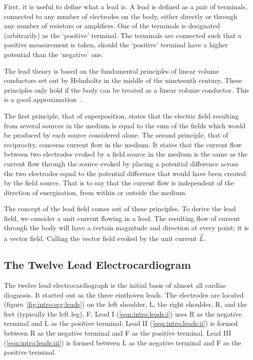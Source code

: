 First, it is useful to define what a lead is.
A lead is defined as a pair of terminals, connected to any number of electrodes
on the body, either directly or through any number of resistors or amplifiers.
One of the terminals is designated (arbitrarily) as the `positive' terminal.
The terminals are connected such that a positive measurement is taken, should
the `positive' terminal have a higher potential than the `negative' one.

The lead theory is based on the fundamental principles of linear volume
conductors set out by Helmholtz in the middle of the nineteenth century.
These principles only hold if the body can be treated as a linear volume
conductor.
This is a good approximation~\cite{REFS}.

The first principle, that of superposition, states that the electric field
resulting from several sources in the medium is equal to the sum of the fields
which would be produced by each source considered alone.
The second principle, that of reciprocity, concerns current flow in the
medium.
It states that the current flow between two electrodes evoked by a field source in the
medium is the same as the current flow through the source evoked by placing a
potential difference across the two electrodes equal to the potential difference
that would have been created by the field source.
That is to say that the current flow is independent of the direction of
energisation, from within or outside the medium.

The concept of the lead field comes out of these principles.
To derive the lead field, we consider a unit current flowing in a lead.
The resulting flow of current through the body will have a certain magnitude and
direction at every point; it is a vector field.
Calling the vector field evoked by the unit current $\vec{L}$.

\subsection{The Twelve Lead Electrocardiogram}

The twelve lead electrocardiograph is the initial basis of almost all cardiac
diagnosis.
It started out as the three einthoven leads.
The electrodes are located (figure~\ref{fig:intro:ecg:leads}) on the left
shoulder, L, the right shoulder, R, and the feet (typically the left leg), F.
Lead I (\ref{eqn:intro:leads:i}) uses R as the negative terminal and L as the
positive terminal.
Lead II (\ref{eqn:intro:leads:ii}) is formed between R as the negative terminal
and F as the positive terminal.
Lead III (\ref{eqn:intro:leads:iii}) is formed between L as the negative terminal
and F as the positive terminal.

